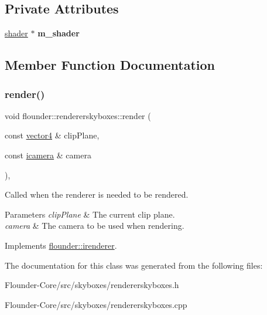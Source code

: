 \subsection*{Private Attributes}
\begin{DoxyCompactItemize}
\item 
\mbox{\label{classflounder_1_1rendererskyboxes_ab1fb9de8e2e19c729404c77daf3a33c8}} 
\hyperlink{classflounder_1_1shader}{shader} $\ast$ {\bfseries m\+\_\+shader}
\end{DoxyCompactItemize}


\subsection{Member Function Documentation}
\mbox{\label{classflounder_1_1rendererskyboxes_a436679aedf4ea978d8683f2dfe82ecd5}} 
\subsubsection{\texorpdfstring{render()}{render()}}
{\footnotesize\ttfamily void flounder\+::rendererskyboxes\+::render (\begin{DoxyParamCaption}\item[{const \hyperlink{classflounder_1_1vector4}{vector4} \&}]{clip\+Plane,  }\item[{const \hyperlink{classflounder_1_1icamera}{icamera} \&}]{camera }\end{DoxyParamCaption})\hspace{0.3cm}{\ttfamily [override]}, {\ttfamily [virtual]}}



Called when the renderer is needed to be rendered. 


\begin{DoxyParams}{Parameters}
{\em clip\+Plane} & The current clip plane. \\
\hline
{\em camera} & The camera to be used when rendering. \\
\hline
\end{DoxyParams}


Implements \hyperlink{classflounder_1_1irenderer_a3f355dc39e2680bf3f3441d3dfaaa010}{flounder\+::irenderer}.



The documentation for this class was generated from the following files\+:\begin{DoxyCompactItemize}
\item 
Flounder-\/\+Core/src/skyboxes/rendererskyboxes.\+h\item 
Flounder-\/\+Core/src/skyboxes/rendererskyboxes.\+cpp\end{DoxyCompactItemize}
